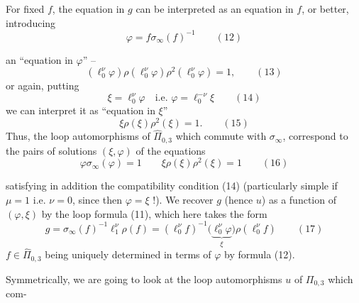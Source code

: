 
For fixed $f$, the equation in $g$ can be interpreted as an equation in $f$, or better, introducing
\[
\varphi=f\sigma_\infty(f)^{-1}
\qquad (12)
\]



an ``equation in $\varphi$'' --
\[
(\ell_0^\nu\varphi)\rho(\ell_0^\nu\varphi)\rho^2(\ell_0^\nu\varphi)=1,
\qquad (13)
\]
or again, putting
\[
\boxed{\xi=\ell_0^\nu\varphi\quad\text{i.e. }\varphi=\ell_0^{-\nu}\xi}
\qquad (14)
\]
we can interpret it as ``equation in $\xi$''
\[
\xi\rho(\xi)\rho^2(\xi)=1.
\qquad (15)
\]
Thus, the loop automorphisms of $\widehat{\Pi}_{0,3}$ which commute with $\sigma_\infty$,  correspond to the pairs of solutions $(\xi,\varphi)$ of the equations
\[
\boxed{\varphi\sigma_\infty(\varphi)=1\qquad
\xi\rho(\xi)\rho^2(\xi)=1}
\qquad (16)
\]


satisfying in addition the compatibility condition (14) (particularly simple  if $\mu=1$ i.e. \deleted{$\mu=$} $\nu=0$, since then $\varphi=\xi$ !). We recover $g$ (hence $u$)  as a function
of $(\varphi,\xi)$ by the loop formula (11), which here takes the form
\[
g=\sigma_\infty(f)^{-1}\ell_1^\nu\rho(f)
=(\ell_0^\nu f)^{-1}\bigl(\underbrace{\ell_0^\nu\varphi}_{\xi}\bigr)\rho(\ell_0^\nu f)
\qquad (17)
\]
$f\in\widehat{\Pi}_{0,3}$ being uniquely determined in terms of $\varphi$ by formula (12).

Symmetrically, we are going to look at the loop automorphisms $u$ of $\Pi_{0,3}$ which com-



